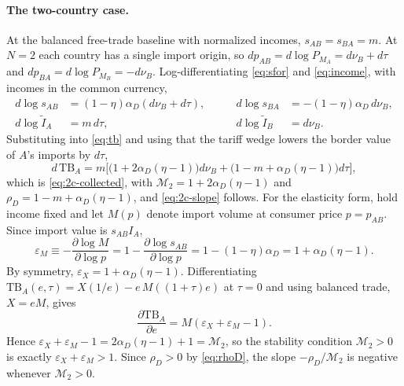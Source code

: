 \documentclass[11pt]{article}
\begin{document}
\paragraph{The two-country case.}
At the balanced free-trade baseline with normalized incomes, $s_{AB}=s_{BA}=m$. At $N=2$ each country has a single import origin, so $dp_{AB} = d\log P_{M_A} = d\nu_B + d\tau$ and $dp_{BA} = d\log P_{M_B} = -d\nu_B$. Log-differentiating \eqref{eq:sfor} and \eqref{eq:income}, with incomes in the common currency,
\[
\begin{aligned}
d\log s_{AB} &= (1-\eta)\alpha_D(d\nu_B+d\tau),
&\qquad
d\log s_{BA} &= -(1-\eta)\alpha_D\,d\nu_B,\\
d\log \widetilde I_A &= m\,d\tau,
&\qquad
d\log \widetilde I_B &= d\nu_B .
\end{aligned}
\]
Substituting into \eqref{eq:tb} and using that the tariff wedge lowers the border value of $A$'s imports by $d\tau$,
\[
d\,\mathrm{TB}_A = m\Big[\big(1+2\alpha_D(\eta-1)\big)d\nu_B + \big(1-m+\alpha_D(\eta-1)\big)d\tau\Big] ,
\]
which is \eqref{eq:2c-collected}, with $\mathcal M_2=1+2\alpha_D(\eta-1)$ and $\rho_D=1-m+\alpha_D(\eta-1)$, and \eqref{eq:2c-slope} follows. For the elasticity form, hold income fixed and let $M(p)$ denote import volume at consumer price $p=p_{AB}$. Since import value is $s_{AB}I_A$,
\[
\varepsilon_M \equiv -\frac{\partial\log M}{\partial\log p} = 1-\frac{\partial\log s_{AB}}{\partial\log p} = 1-(1-\eta)\alpha_D = 1+\alpha_D(\eta-1).
\]
By symmetry, $\varepsilon_X=1+\alpha_D(\eta-1)$. Differentiating $\mathrm{TB}_A(e,\tau)=X(1/e)-e\,M((1+\tau)e)$ at $\tau=0$ and using balanced trade, $X=eM$, gives
\[
\frac{\partial\mathrm{TB}_A}{\partial e} = M(\varepsilon_X+\varepsilon_M-1).
\]
Hence $\varepsilon_X+\varepsilon_M-1=2\alpha_D(\eta-1)+1=\mathcal M_2$, so the stability condition $\mathcal M_2>0$ is exactly $\varepsilon_X+\varepsilon_M>1$. Since $\rho_D>0$ by \eqref{eq:rhoD}, the slope $-\rho_D/\mathcal M_2$ is negative whenever $\mathcal M_2>0$.
\end{document}
